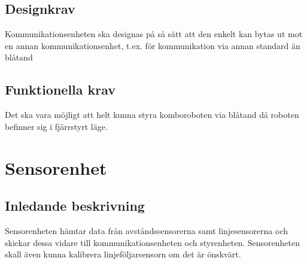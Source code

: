 \documentclass[a4paper,12pt]{article}
\begin{document}
\begin{LIPSkravlista}
\end{LIPSkravlista}

\subsection{Designkrav}
Kommunikationsenheten ska designas på så sätt att den enkelt kan bytas ut mot en annan kommunikationsenhet,
t.ex. för kommunikation via annan standard än blåtand


\begin{LIPSkravlista}
\end{LIPSkravlista}

\subsection{Funktionella krav}
Det ska vara möjligt att helt kunna styra komboroboten via blåtand då roboten befinner sig i fjärrstyrt läge.


\begin{LIPSkravlista}
\end{LIPSkravlista}

\section{Sensorenhet}
\subsection{Inledande beskrivning}
Sensorenheten hämtar data från avståndssensorerna samt linjesensorerna 
och skickar dessa vidare till kommunikationsenheten och styrenheten. 
Sensorenheten skall även kunna kalibrera linjeföljarsensorn om det är önskvärt.


\begin{LIPSkravlista}
\end{LIPSkravlista}
\end{document}
